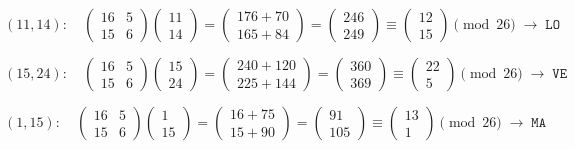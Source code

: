 \documentclass[12pt,a3paper]{article}
\begin{document}
\begin{tcolorbox}
\[
(11,14):\quad
\begin{pmatrix}16&5\\15&6\end{pmatrix}\begin{pmatrix}11\\14\end{pmatrix}
=\begin{pmatrix}176+70\\165+84\end{pmatrix}
=\begin{pmatrix}246\\249\end{pmatrix}
\equiv\begin{pmatrix}12\\15\end{pmatrix}\pmod{26}
\;\to\;\texttt{LO}
\]

\[
(15,24):\quad
\begin{pmatrix}16&5\\15&6\end{pmatrix}\begin{pmatrix}15\\24\end{pmatrix}
=\begin{pmatrix}240+120\\225+144\end{pmatrix}
=\begin{pmatrix}360\\369\end{pmatrix}
\equiv\begin{pmatrix}22\\5\end{pmatrix}\pmod{26}
\;\to\;\texttt{VE}
\]

\[
(1,15):\quad
\begin{pmatrix}16&5\\15&6\end{pmatrix}\begin{pmatrix}1\\15\end{pmatrix}
=\begin{pmatrix}16+75\\15+90\end{pmatrix}
=\begin{pmatrix}91\\105\end{pmatrix}
\equiv\begin{pmatrix}13\\1\end{pmatrix}\pmod{26}
\;\to\;\texttt{MA}
\]


\end{tcolorbox}
\end{document}
